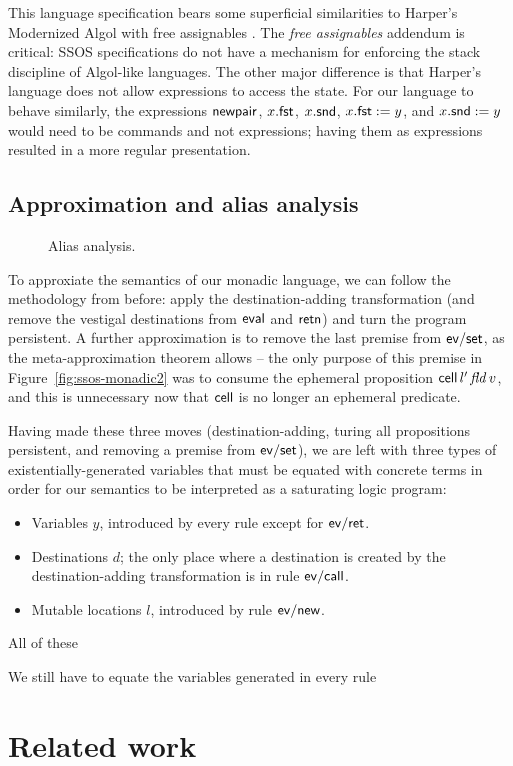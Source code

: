 This language specification bears some superficial similarities to
Harper's Modernized Algol with free assignables \cite[Chapter
36]{harper12practical}. The {\it free assignables} addendum is
critical: SSOS specifications do not have a mechanism for enforcing
the stack discipline of Algol-like languages. The other major
difference is that Harper's language does not allow expressions to
access the state.  For our language to behave similarly, the
expressions ${\sf newpair}$, $x.{\sf fst}$, $x.{\sf snd}$, $x.{\sf
  fst} := y$, and $x.{\sf snd} := y$ would need to be commands and not
expressions; having them as expressions resulted in a more regular
presentation.

\subsection{Approximation and alias analysis}


\begin{figure}[t]
\caption{Alias analysis.}
\label{fig:ssos-monadic-approx}
\end{figure}


To approxiate the semantics of our monadic language, we can follow the
methodology from before: apply the destination-adding transformation
(and remove the vestigal destinations from ${\sf eval}$ and ${\sf
  retn}$) and turn the program persistent. A further approximation is
to remove the last premise from ${\sf ev/set}$, as the
meta-approximation theorem allows -- the only purpose of this premise
in Figure~\ref{fig:ssos-monadic2} was to consume the ephemeral
proposition ${\sf cell}\,l'\,{\it fld}\,v$, and this is unnecessary now
that ${\sf cell}$ is no longer an ephemeral predicate.

Having made these three moves (destination-adding, turing all
propositions persistent, and removing a premise from ${\sf ev/set}$),
we are left with three types of existentially-generated variables
that must be equated with concrete terms in order for our semantics
to be interpreted as a saturating logic program:

\smallskip
\begin{itemize}
\item Variables $y$, introduced by every rule except for ${\sf ev/ret}$.
\item Destinations $d$; the only place where a destination is created
by the destination-adding transformation is in rule ${\sf ev/call}$. 
\item Mutable locations $l$, introduced by rule ${\sf ev/new}$. 
\end{itemize}

All of these 

We still have to equate the
variables generated in every rule

\section{Related work}
